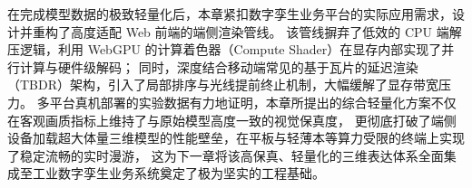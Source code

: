 在完成模型数据的极致轻量化后，本章紧扣数字孪生业务平台的实际应用需求，设计并重构了高度适配 Web 前端的端侧渲染管线。
该管线摒弃了低效的 CPU 端解压逻辑，利用 WebGPU 的计算着色器（Compute Shader）在显存内部实现了并行计算与硬件级解码；
同时，深度结合移动端常见的基于瓦片的延迟渲染（TBDR）架构，引入了局部排序与光线提前终止机制，大幅缓解了显存带宽压力。
多平台真机部署的实验数据有力地证明，本章所提出的综合轻量化方案不仅在客观画质指标上维持了与原始模型高度一致的视觉保真度，
更彻底打破了端侧设备加载超大体量三维模型的性能壁垒，在平板与轻薄本等算力受限的终端上实现了稳定流畅的实时漫游，
这为下一章将该高保真、轻量化的三维表达体系全面集成至工业数字孪生业务系统奠定了极为坚实的工程基础。